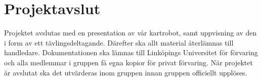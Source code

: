 \documentclass[a4paper,11pt]{article}
\begin{document}
\section{Projektavslut}
Projektet avslutas med en presentation av vår kartrobot, samt uppvisning av den i form av ett tävlingsdeltagande. Därefter ska allt material återlämnas till handledare. Dokumentationen ska lämnas till Linköpings Universitet för förvaring och alla medlemmar i gruppen få egna kopior för privat förvaring. När projektet är avslutat ska det utvärderas inom gruppen innan gruppen officiellt upplöses.

\clearpage

\begin{appendices}

\end{appendices}
\clearpage
{}	%
\printbibliography
\end{document}
